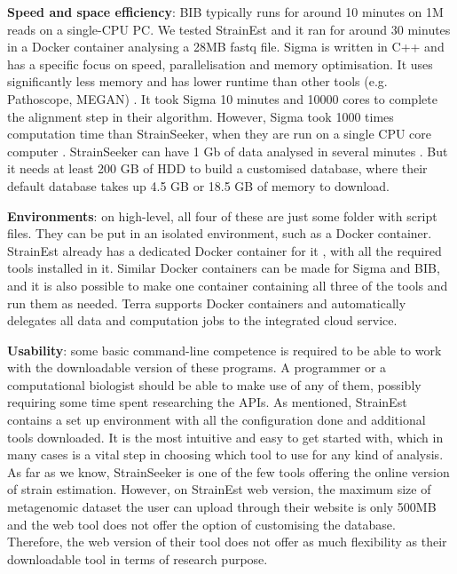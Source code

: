 \documentclass{report}
\begin{document}
\textbf{Speed and space efficiency}: BIB typically runs for around 10 minutes on 1M reads on a single-CPU PC. We tested StrainEst and it ran for around 30 minutes in a Docker container analysing a 28MB fastq file. Sigma is written in C++ and has a specific focus on speed, parallelisation and memory optimisation. It uses significantly less memory and has lower runtime than other tools (e.g. Pathoscope, MEGAN) \cite{ahn2015sigma}. It took Sigma 10 minutes and 10000 cores to complete the alignment step in their algorithm. However, Sigma took 1000 times computation time than StrainSeeker, when they are run on a single CPU core computer \cite{roosaare2017strainseeker}. StrainSeeker can have 1 Gb of data analysed in several minutes \cite{roosaare2017strainseeker}. But it needs at least 200 GB of HDD to build a customised database, where their default database takes up 4.5 GB or 18.5 GB of memory to download.

\textbf{Environments}:
on high-level, all four of these are just some folder with script files. They can be put in an isolated environment, such as a Docker container. StrainEst already has a dedicated Docker container for it \cite{strainest_docker}, with all the required tools installed in it. Similar Docker containers can be made for Sigma and BIB, and it is also possible to make one container containing all three of the tools and run them as needed. Terra supports Docker containers and automatically delegates all data and computation jobs to the integrated cloud service. 

\textbf{Usability}: some basic command-line competence is required to be able to work with the downloadable version of these programs. A programmer or a computational biologist should be able to make use of any of them, possibly requiring some time spent researching the APIs. As mentioned, StrainEst contains a set up environment with all the configuration done and additional tools downloaded. It is the most intuitive and easy to get started with, which in many cases is a vital step in choosing which tool to use for any kind of analysis. As far as we know, StrainSeeker is one of the few tools offering the online version of strain estimation. However, on StrainEst web version, the maximum size of metagenomic dataset the user can upload through their website is only 500MB and the web tool does not offer the option of customising the database. Therefore, the web version of their tool does not offer as much flexibility as their downloadable tool in terms of research purpose.
\end{document}
